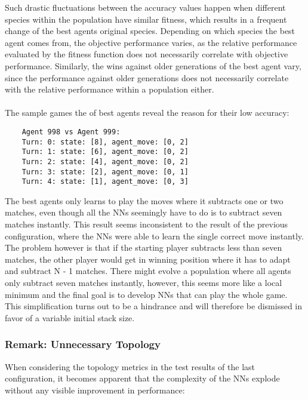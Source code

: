Such drastic fluctuations between the accuracy values happen when different species within the population have similar fitness, which results in a frequent change of the best agents original species.
Depending on which species the best agent comes from, the objective performance varies, as the relative performance evaluated by the fitness function does not necessarily correlate with objective performance.
Similarly, the wins against older generations of the best agent vary, since the performance against older generations does not necessarily correlate with the relative performance within a population either.
\\ \\
The sample games the of best agents reveal the reason for their low accuracy:
\begin{verbatim}
    Agent 998 vs Agent 999:
    Turn: 0: state: [8], agent_move: [0, 2]
    Turn: 1: state: [6], agent_move: [0, 2]
    Turn: 2: state: [4], agent_move: [0, 2]
    Turn: 3: state: [2], agent_move: [0, 1]
    Turn: 4: state: [1], agent_move: [0, 3]
\end{verbatim}
The best agents only learns to play the moves where it subtracts one or two matches, even though all the NNs seemingly have to do is to subtract seven matches instantly.
This result seems inconsistent to the result of the previous configuration, where the NNs were able to learn the single correct move instantly.
The problem however is that if the starting player subtracts less than seven matches, the other player would get in winning position where it has to adapt and subtract N - 1 matches.
There might evolve a population where all agents only subtract seven matches instantly, however, this seems more like a local minimum and the final goal is to develop NNs that can play the whole game.
This simplification turns out to be a hindrance and will therefore be dismissed in favor of a variable initial stack size.

\subsubsection{Remark: Unnecessary Topology}
When considering the topology metrics in the test results of the last configuration, it becomes apparent that the complexity of the NNs explode without any visible improvement in performance:
\renewcommand{\csvpath}{../data/simple_nim/stack_8/t_1/stats.csv} %


